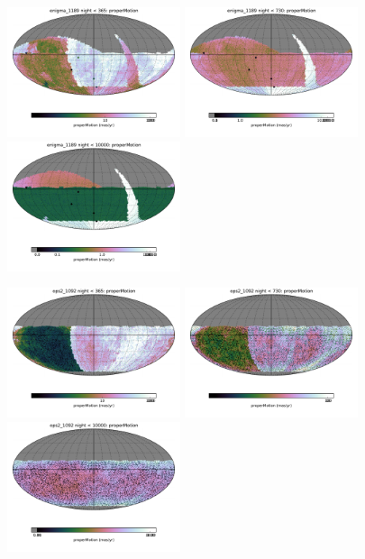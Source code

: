 \begin{figure}[ht]
  \begin{center}
  \includegraphics[width=2.0in]{./figs/milkyway/MW_Astrom_pmError_1189_01y_map.pdf}
  \includegraphics[width=2.0in]{./figs/milkyway/MW_Astrom_pmError_1189_02y_map.pdf}
  \includegraphics[width=2.0in]{./figs/milkyway/MW_Astrom_pmError_1189_10y_map.pdf}
  \end{center}
  \begin{center}
  \includegraphics[width=2.0in]{./figs/milkyway/MW_Astrom_pmError_1092_01y_map.pdf}
  \includegraphics[width=2.0in]{./figs/milkyway/MW_Astrom_pmError_1092_02y_map.pdf}
  \includegraphics[width=2.0in]{./figs/milkyway/MW_Astrom_pmError_1092_10y_map.pdf}
  \end{center}


\end{figure}
